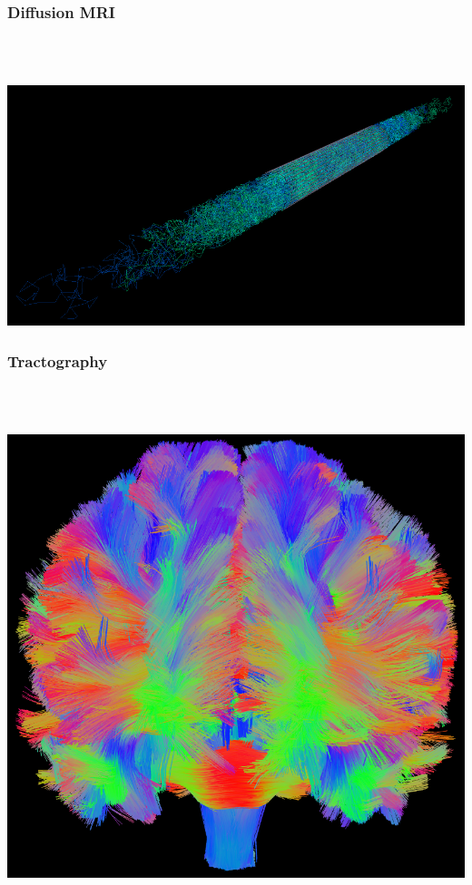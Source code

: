 \documentclass[aspectratio=169]{beamer}
\begin{document}
		\begin{frame}
		\frametitle{Diffusion MRI}
		\quad \\ \quad \\
		\begin{center}
		\includegraphics[width=.9\linewidth]{img/diffusion}
		\end{center}
		\end{frame}
		
		\begin{frame}
		\frametitle{Tractography}
		\quad \\ \quad \\
		\begin{center}
		\includegraphics[width=.5\linewidth]{img/fulltract}
		\end{center}
		\end{frame}
		
\end{document}
